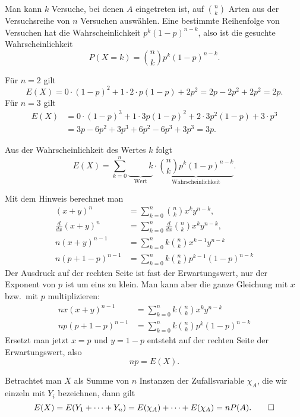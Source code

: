 \begin{loesung}
\begin{teilaufgaben}
\item
Man kann $k$ Versuche, bei denen $A$ eingetreten ist, auf
$\binom{n}{k}$ Arten aus der Versuchsreihe von $n$ Versuchen
auswählen. Eine bestimmte Reihenfolge von Versuchen hat die
Wahrscheinlichkeit $p^k(1-p)^{n-k}$, also ist die gesuchte
Wahrscheinlichkeit
\[
P(X=k)=\binom{n}{k}p^k(1-p)^{n-k}.
\]
\item
Für $n=2$ gilt
\[
E(X)=
0\cdot (1-p)^2+1\cdot 2\cdot p(1-p)+2p^2=2p-2p^2+2p^2=2p.
\]
Für $n=3$ gilt
\begin{align*}
E(X)&=0\cdot (1-p)^3+1\cdot 3p(1-p)^2+2\cdot 3p^2(1-p)+3\cdot p^3\\
&=3p-6p^2+3p^3+6p^2-6p^3+3p^3=3p.
\end{align*}
\item
Aus der Wahrscheinlichkeit des Wertes $k$ folgt
\[
E(X)=\sum_{k=0}^n\underbrace{\phantom{\binom{n}{k}}k}_{\text{Wert}}\cdot
\underbrace{\binom{n}{k}p^k(1-p)^{n-k}}_{\text{Wahrscheinlichkeit}}.
\]
\item Mit dem Hinweis berechnet man
\begin{align*}
(x+y)^n&=\sum_{k=0}^n\binom{n}{k}x^ky^{n-k},\\
\frac{d}{dx}
(x+y)^n&= \sum_{k=0}^n \frac{d}{dx} \binom{n}{k}x^ky^{n-k},\\
n(x+y)^{n-1}&=\sum_{k=0}^nk\binom{n}{k}x^{k-1}y^{n-k}\\
n(p+1-p)^{n-1}&=\sum_{k=0}^nk\binom{n}{k}p^{k-1}(1-p)^{n-k}
\end{align*}
Der Ausdruck auf der rechten Seite ist fast der Erwartungswert, nur
der Exponent von $p$ ist um eins zu klein. Man kann aber die ganze
Gleichung mit $x$ bzw.~mit $p$ multiplizieren:
\begin{align*}
nx(x+y)^{n-1}&=\sum_{k=0}^nk\binom{n}{k}x^ky^{n-k}\\
np(p+1-p)^{n-1}&=\sum_{k=0}^nk\binom{n}{k}p^k(1-p)^{n-k}
\end{align*}
Ersetzt man jetzt $x=p$ und $y=1-p$
entsteht auf der rechten
Seite der Erwartungswert, also
\[
np=E(X).
\]
\item
Betrachtet man $X$ als Summe von $n$ Instanzen der Zufallsvariable
$\chi_A$, die wir einzeln mit $Y_i$ bezeichnen, dann gilt
\[
E(X)=E(Y_1+\dots+Y_n)=E(\chi_A)+\dots +E(\chi_A)=nP(A).
\qedhere
\]
\end{teilaufgaben}
\end{loesung}

